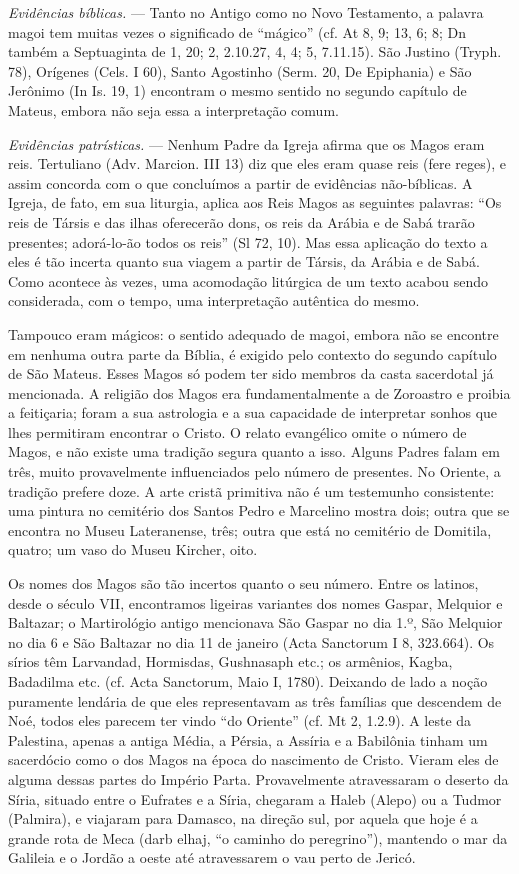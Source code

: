\documentclass[a4paper,14pt]{extarticle} \usepackage[utf8]{inputenc}
\begin{document}
\textit{Evidências bíblicas.} — Tanto no Antigo como no Novo Testamento, a palavra magoi tem muitas vezes o significado de “mágico” (cf. At 8, 9; 13, 6; 8; Dn também a Septuaginta de 1, 20; 2, 2.10.27, 4, 4; 5, 7.11.15). São Justino (Tryph. 78), Orígenes (Cels. I 60), Santo Agostinho (Serm. 20, De Epiphania) e São Jerônimo (In Is. 19, 1) encontram o mesmo sentido no segundo capítulo de Mateus, embora não seja essa a interpretação comum.

\textit{Evidências patrísticas.} — Nenhum Padre da Igreja afirma que os Magos eram reis. Tertuliano (Adv. Marcion. III 13) diz que eles eram quase reis (fere reges), e assim concorda com o que concluímos a partir de evidências não-bíblicas. A Igreja, de fato, em sua liturgia, aplica aos Reis Magos as seguintes palavras: “Os reis de Társis e das ilhas oferecerão dons, os reis da Arábia e de Sabá trarão presentes; adorá-lo-ão todos os reis” (Sl 72, 10). Mas essa aplicação do texto a eles é tão incerta quanto sua viagem a partir de Társis, da Arábia e de Sabá. Como acontece às vezes, uma acomodação litúrgica de um texto acabou sendo considerada, com o tempo, uma interpretação autêntica do mesmo.

Tampouco eram mágicos: o sentido adequado de magoi, embora não se encontre em nenhuma outra parte da Bíblia, é exigido pelo contexto do segundo capítulo de São Mateus. Esses Magos só podem ter sido membros da casta sacerdotal já mencionada. A religião dos Magos era fundamentalmente a de Zoroastro e proibia a feitiçaria; foram a sua astrologia e a sua capacidade de interpretar sonhos que lhes permitiram encontrar o Cristo. O relato evangélico omite o número de Magos, e não existe uma tradição segura quanto a isso. Alguns Padres falam em três, muito provavelmente influenciados pelo número de presentes. No Oriente, a tradição prefere doze. A arte cristã primitiva não é um testemunho consistente: uma pintura no cemitério dos Santos Pedro e Marcelino mostra dois; outra que se encontra no Museu Lateranense, três; outra que está no cemitério de Domitila, quatro; um vaso do Museu Kircher, oito.

Os nomes dos Magos são tão incertos quanto o seu número. Entre os latinos, desde o século VII, encontramos ligeiras variantes dos nomes Gaspar, Melquior e Baltazar; o Martirológio antigo mencionava São Gaspar no dia 1.º, São Melquior no dia 6 e São Baltazar no dia 11 de janeiro (Acta Sanctorum I 8, 323.664). Os sírios têm Larvandad, Hormisdas, Gushnasaph etc.; os armênios, Kagba, Badadilma etc. (cf. Acta Sanctorum, Maio I, 1780). Deixando de lado a noção puramente lendária de que eles representavam as três famílias que descendem de Noé, todos eles parecem ter vindo “do Oriente” (cf. Mt 2, 1.2.9). A leste da Palestina, apenas a antiga Média, a Pérsia, a Assíria e a Babilônia tinham um sacerdócio como o dos Magos na época do nascimento de Cristo. Vieram eles de alguma dessas partes do Império Parta. Provavelmente atravessaram o deserto da Síria, situado entre o Eufrates e a Síria, chegaram a Haleb (Alepo) ou a Tudmor (Palmira), e viajaram para Damasco, na direção sul, por aquela que hoje é a grande rota de Meca (darb elhaj, “o caminho do peregrino”), mantendo o mar da Galileia e o Jordão a oeste até atravessarem o vau perto de Jericó.
\end{document}
